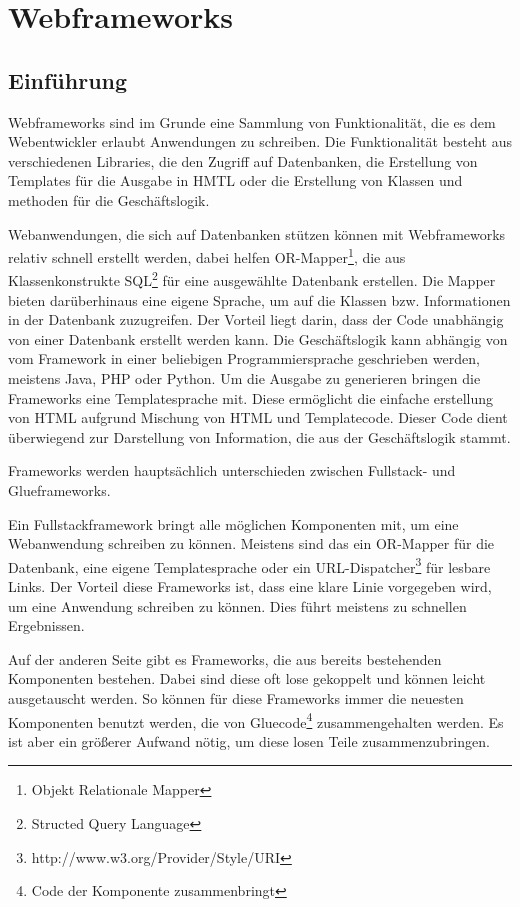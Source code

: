\chapter{Webframeworks}
\section{Einführung}
Webframeworks sind im Grunde eine Sammlung von Funktionalität, die es dem
Webentwickler erlaubt Anwendungen zu schreiben. Die Funktionalität besteht aus
verschiedenen Libraries, die den Zugriff auf Datenbanken, die Erstellung von
Templates für die Ausgabe in HMTL oder die Erstellung von Klassen und methoden
für die Geschäftslogik. 

Webanwendungen, die sich auf Datenbanken stützen können mit Webframeworks
relativ schnell erstellt werden, dabei helfen OR-Mapper\footnote{Objekt
Relationale Mapper}, die aus Klassenkonstrukte SQL\footnote{Structed Query
Language} für eine ausgewählte Datenbank erstellen. Die Mapper bieten
darüberhinaus eine eigene Sprache, um auf die Klassen bzw. Informationen in der
Datenbank zuzugreifen. Der Vorteil liegt darin, dass der Code unabhängig von
einer Datenbank erstellt werden kann. Die Geschäftslogik kann abhängig von vom
Framework in einer beliebigen Programmiersprache geschrieben werden, meistens
Java, PHP oder Python. Um die Ausgabe zu generieren bringen die Frameworks eine
Templatesprache mit. Diese ermöglicht die einfache erstellung von HTML aufgrund
Mischung von HTML und Templatecode. Dieser Code dient überwiegend zur
Darstellung von Information, die aus der Geschäftslogik stammt. 

Frameworks werden hauptsächlich unterschieden zwischen Fullstack- und
Glueframeworks.

Ein Fullstackframework bringt alle möglichen Komponenten mit,
um eine Webanwendung schreiben zu können. Meistens sind das ein OR-Mapper für
die Datenbank, eine eigene Templatesprache oder ein
URL-Dispatcher\footnote{http://www.w3.org/Provider/Style/URI} für lesbare
Links. Der Vorteil diese Frameworks ist, dass eine klare Linie vorgegeben wird,
um eine Anwendung schreiben zu können. Dies führt meistens zu schnellen
Ergebnissen. 

Auf der anderen Seite gibt es Frameworks, die aus bereits bestehenden
Komponenten bestehen. Dabei sind diese oft lose gekoppelt und können leicht
ausgetauscht werden. So können für diese Frameworks immer die neuesten
Komponenten benutzt werden, die von Gluecode\footnote{Code der Komponente
zusammenbringt} zusammengehalten werden. Es ist aber ein größerer Aufwand nötig,
um diese losen Teile zusammenzubringen. 